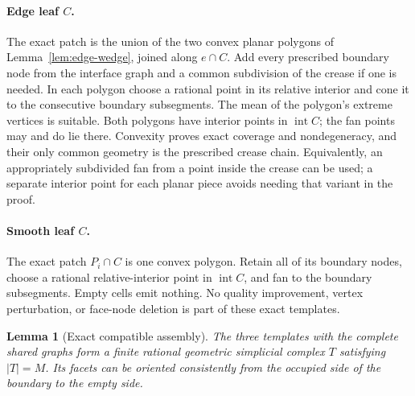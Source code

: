 \documentclass[11pt]{article}
\newtheorem{lemma}[theorem]{Lemma}
\theoremstyle{definition}
\theoremstyle{remark}
\newcommand{\intr}{\operatorname{int}}
\begin{document}
\paragraph{Edge leaf $C$.}
The exact patch is the union of the two convex planar polygons of
Lemma~\ref{lem:edge-wedge}, joined along $e\cap C$. Add every prescribed
boundary node from the interface graph and a common subdivision of
the crease if one is needed. In each polygon choose a rational point
in its relative interior and cone it to the consecutive boundary
subsegments. The mean of the polygon's extreme vertices is suitable.
Both polygons have interior points in $\intr C$; the fan points may
and do lie there. Convexity proves exact coverage and nondegeneracy,
and their only common geometry is the prescribed crease chain.
Equivalently, an appropriately subdivided fan from a point inside
the crease can be used; a separate interior point for each planar
piece avoids needing that variant in the proof.

\paragraph{Smooth leaf $C$.}
The exact patch $P_i\cap C$ is one convex polygon. Retain all of its
boundary nodes, choose a rational relative-interior point in
$\intr C$, and fan to the boundary subsegments. Empty cells emit
nothing. No quality improvement, vertex perturbation, or face-node
deletion is part of these exact templates.

\begin{lemma}[Exact compatible assembly]
\label{lem:assembly}
The three templates with the complete shared graphs form a finite
rational geometric simplicial complex $T$ satisfying $|T|=M$.
Its facets can be oriented consistently from the occupied side of
the boundary to the empty side.
\end{lemma}
\end{document}
